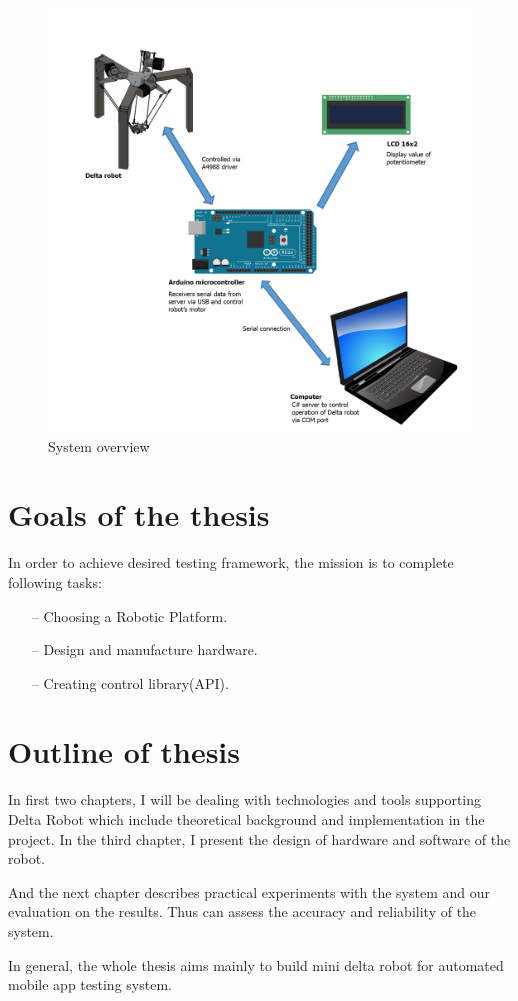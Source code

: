 \begin{figure}[H]
	\centering
	\includegraphics[width=\maxwidth{17cm}, keepaspectratio]{Chapters/Fig/system_overview.png}
	\caption{System overview}
	\label{fig:system_overview}
\end{figure}

\section{Goals of the thesis}
In order to achieve desired testing framework, the mission is to complete following tasks:
	\begin{itemize}
		\item[--] Choosing a Robotic Platform.
		\item[--] Design and manufacture hardware.
		\item[--] Creating control library(API).
	\end{itemize}

\section{Outline of thesis}
In first two chapters, I will be dealing with technologies and tools supporting Delta Robot which include theoretical background and implementation in the project.
In the third chapter, I present the design of hardware and software of the robot.

And the next chapter describes practical experiments with the system and our evaluation on the results. Thus can assess the accuracy and reliability of the system.

In general, the whole thesis aims mainly to build mini delta robot for automated mobile app testing system. \nocite{radim_thesis}